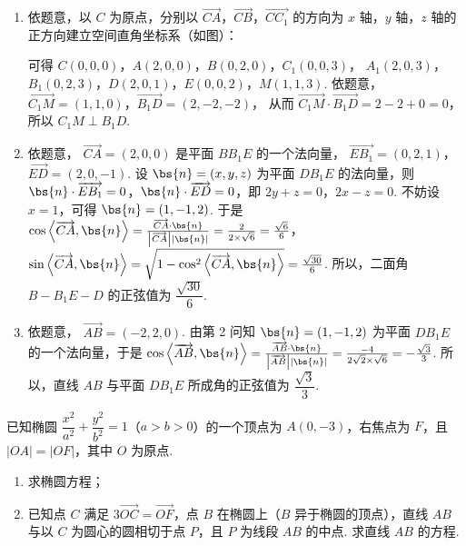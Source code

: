 \begin{solution}
\begin{enumerate}
\item 依题意，以 \(C\) 为原点，分别以 \( \overrightarrow{CA} \)，\( \overrightarrow{CB} \)，\( \overrightarrow{CC_1} \) 的方向为 \( x \) 轴，\( y \) 轴，\( z \) 轴的正方向建立空间直角坐标系（如图）：


可得
\(C(0,0,0)\)，\(A(2,0,0)\)，\(B(0,2,0)\)，\(C_1(0,0,3)\)，
\(A_1(2,0,3)\)，\(B_1(0,2,3)\)，\(D(2,0,1)\)，\(E(0,0,2)\)，\(M(1,1,3)\).
依题意，
\(\overrightarrow{C_1M}=(1,1,0)\)，\(\overrightarrow{B_1D}=(2,-2,-2)\)，
从而
\(\overrightarrow{C_1M}\cdot\overrightarrow{B_1D}=2-2+0=0\)，
所以 \( C_1M\perp B_1D \).

\item 依题意， \( \overrightarrow{CA}=(2,0,0) \) 是平面 \(BB_1E\) 的一个法向量，
\(\overrightarrow{EB_1}=(0,2,1)\)，\(\overrightarrow{ED}=(2,0,-1)\).
设 \( \bs{n}=(x,y,z) \) 为平面 \(DB_1E\) 的法向量，则 \( \bs{n}\cdot\overrightarrow{EB_1}=0 \)，\( \bs{n}\cdot\overrightarrow{ED}=0 \)，即 \( 2y+z=0 \)，\( 2x-z=0 \).
不妨设 \( x=1 \)，可得 \( \bs{n}=(1,-1,2) \).
于是
\(\cos\left\langle \overrightarrow{CA},\bs{n} \right\rangle
=\frac{\overrightarrow{CA}\cdot\bs{n}}{\left| \overrightarrow{CA} \right|\left| \bs{n} \right|}
=\frac{2}{2\times\sqrt6}
=\frac{\sqrt6}{6}\)，
\(\sin\left\langle \overrightarrow{CA},\bs{n} \right\rangle
=\sqrt{1-\cos^2\left\langle \overrightarrow{CA},\bs{n} \right\rangle}
=\frac{\sqrt{30}}{6}\).
所以，二面角 \( B-B_1E-D \) 的正弦值为 \( \dfrac{\sqrt{30}}{6} \).

\item 依题意，
\(\overrightarrow{AB}=(-2,2,0)\).
由第 2 问知 \( \bs{n}=(1,-1,2) \) 为平面 \(DB_1E\) 的一个法向量，于是
\(\cos\left\langle \overrightarrow{AB},\bs{n} \right\rangle
=\frac{\overrightarrow{AB}\cdot\bs{n}}{\left| \overrightarrow{AB} \right|\left| \bs{n} \right|}
=\frac{-4}{2\sqrt2\times\sqrt6}
=-\frac{\sqrt3}{3}\).
所以，直线 \(AB\) 与平面 \(DB_1E\) 所成角的正弦值为 \( \dfrac{\sqrt3}{3} \).
\end{enumerate}
\end{solution}

\begin{problem}
已知椭圆 \(\dfrac{x^2}{a^2}+\dfrac{y^2}{b^2}=1\)（\(a>b>0\)）的一个顶点为 \(A(0,-3)\)，右焦点为 \(F\)，且 \(|OA|=|OF|\)，其中 \(O\) 为原点.

\begin{enumerate}
\item 求椭圆方程；
\item 已知点 \(C\) 满足 \(3\overrightarrow{OC}=\overrightarrow{OF}\)，点 \(B\) 在椭圆上（\(B\) 异于椭圆的顶点），直线 \(AB\) 与以 \(C\) 为圆心的圆相切于点 \(P\)，且 \(P\) 为线段 \(AB\) 的中点. 求直线 \(AB\) 的方程.
\end{enumerate}
\end{problem}

